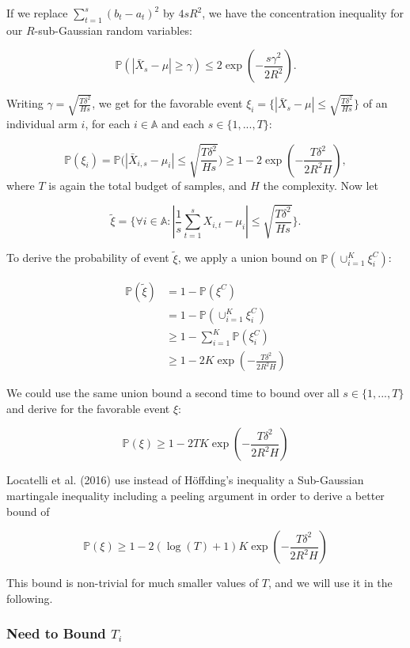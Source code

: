 \documentclass[11pt,]{article}
\begin{document}
If we replace \(\sum_{t=1}^s(b_t - a_t)^2\) by \(4sR^2\), we have the
concentration inequality for our \(R\)-sub-Gaussian random variables:

\[
\mathbb{P}(|\bar{X}_s - \mu| \geq \gamma) \leq 2\exp (-\frac{s\gamma^2}{2R^2}).
\]

Writing \(\gamma = \sqrt{\frac{T\delta^2}{Hs}}\), we get for the
favorable event
\(\xi_i = \{|\bar{X}_s - \mu| \leq \sqrt{\frac{T\delta^2}{Hs}}\}\) of an
individual arm \(i\), for each \(i \in \mathbb{A}\) and each
\(s \in \{1, ..., T\}\):

\[
\mathbb{P}(\xi_i) = \mathbb{P}\Big(|\bar{X}_{i,s} - \mu_i| \leq \sqrt{\frac{T\delta^2}{Hs}}\Big) \geq 1 - 2\exp (-\frac{T\delta^2}{2R^2H}),
\] where \(T\) is again the total budget of samples, and \(H\) the
complexity. Now let

\[
\tilde{\xi} = \Big\{\forall i \in \mathbb{A}: |\frac{1}{s} \sum_{t=1}^{s}X_{i,t} - \mu_i| \leq \sqrt{\frac{T \delta^2}{H s}} \Big\}.
\]

To derive the probability of event \(\tilde{\xi}\), we apply a union
bound on \(\mathbb{P}(\cup_{i=1}^K \xi_i^C)\):

\begin{align*}
\mathbb{P}(\tilde{\xi}) & = 1-\mathbb{P}(\xi^C) \\
& = 1-\mathbb{P}(\cup_{i=1}^K \xi_i^C) \\
& \geq 1 - \sum_{i=1}^K \mathbb{P}(\xi_i^C) \\
& \geq 1 - 2K\exp (-\frac{T\delta^2}{2R^2H})
\end{align*}

We could use the same union bound a second time to bound over all
\(s \in \{1, ..., T\}\) and derive for the favorable event \(\xi\):

\[
\mathbb{P}(\xi) \geq 1 - 2TK \exp(-\frac{T\delta^2}{2R^2H})
\]

Locatelli et al. (2016) use instead of Höffding's inequality a
Sub-Gaussian martingale inequality including a peeling argument in order
to derive a better bound of

\[
\mathbb{P}(\xi) \geq 1 - 2(\log(T) +1)K \exp(-\frac{T\delta^2}{2R^2H})
\]

This bound is non-trivial for much smaller values of \(T\), and we will
use it in the following.

\subsubsection{\texorpdfstring{Need to Bound
\(T_i\)}{Need to Bound T\_i}}\label{need-to-bound-t_i}
\end{document}
